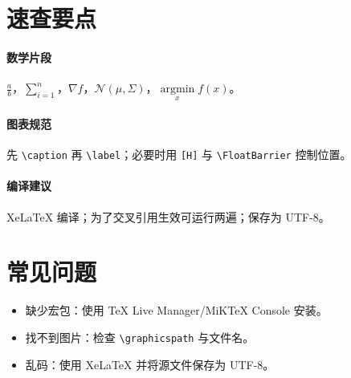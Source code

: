 \documentclass[UTF8,zihao=-4]{ctexart}
\begin{document}
\section{速查要点}
\paragraph{数学片段} $\frac{a}{b}$，$\sum_{i=1}^n$，$\nabla f$，$\mathcal{N}(\mu,\Sigma)$，$\operatorname*{argmin}\limits_x f(x)$。

\paragraph{图表规范} 先 \verb|\caption| 再 \verb|\label|；必要时用 \verb|[H]| 与 \verb|\FloatBarrier| 控制位置。

\paragraph{编译建议} XeLaTeX 编译；为了交叉引用生效可运行两遍；保存为 UTF-8。

\section{常见问题}
\begin{itemize}
  \item 缺少宏包：使用 TeX Live Manager/MiKTeX Console 安装。
  \item 找不到图片：检查 \verb|\graphicspath| 与文件名。
  \item 乱码：使用 XeLaTeX 并将源文件保存为 UTF-8。
\end{itemize}
\end{document}
